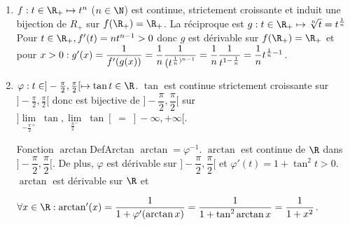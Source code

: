 \documentclass[12pt,a4paper]{report}
\begin{document}
\begin{exemple}[Exemples]{}
\begin{enumerate}
	\item $f : t \in \R_+ \mapsto t^n$ ($n \in \N$) est continue, strictement croissante et induit une bijection de $R_+$ sur $f(\R_+) = \R_+$. La réciproque est $g : t \in \R_+ \mapsto \sqrt[n]{t} = t^{\frac{1}{n}}$ \\
	Pour $t \in \R_+, f'(t) = nt^{n-1}>0$ donc $g$ est dérivable sur $f(\R_+) = \R_+$ et pour $x>0 : \\ \\
	g'(x) = \dfrac{1}{f'(g(x))} = \dfrac{1}{n} \dfrac{1}{(t^{\frac{1}{n})^{n-1}}} = \dfrac{1}{n} \dfrac{1}{t^{1-\frac{1}{n}}} = \dfrac{1}{n} t^{\frac{1}{n}-1}$.
	
	\item $\varphi : t \in ]-\frac{\pi}{2},\frac{\pi}{2}[ \mapsto \tan t \in \R$. $\tan$ est continue strictement croissante sur $]-\frac{\pi}{2},\frac{\pi}{2}[$ donc est bijective de $]-\dfrac{\pi}{2},\dfrac{\pi}{2}[$ sur $]\underset{-\frac{\pi}{2}^+}{\lim} \; \tan, \underset{\frac{\pi}{2}^-}{\lim} \; \tan[ \; = \; ]-\infty,+\infty[$. \\
	
	\begin{definition}{Fonction $\arctan$}{DefArctan}
		$\arctan = \varphi^{-1}$. $\arctan$ est continue de $\R$ dans $]-\dfrac{\pi}{2},\dfrac{\pi}{2}[$. De plus, $\varphi$ est dérivable sur $]-\dfrac{\pi}{2},\dfrac{\pi}{2}[$ et $\varphi'(t) = 1+\tan^2 t>0$. $\arctan$ est dérivable sur $\R$ et \\
		\begin{center}
			$\forall x\in \R : \arctan'(x) = \dfrac{1}{1+\varphi'(\arctan x)} = \dfrac{1}{1+\tan^2 \arctan x} = \dfrac{1}{1+x^2}$.
		\end{center}
	\end{definition}
	

\end{enumerate}
\end{exemple}
\end{document}
